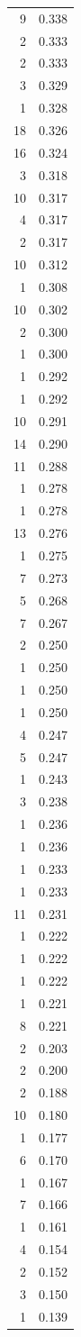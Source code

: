 \begin{tabular}{rr}
9 & 0.338 \\
2 & 0.333 \\
2 & 0.333 \\
3 & 0.329 \\
1 & 0.328 \\
18 & 0.326 \\
16 & 0.324 \\
3 & 0.318 \\
10 & 0.317 \\
4 & 0.317 \\
2 & 0.317 \\
10 & 0.312 \\
1 & 0.308 \\
10 & 0.302 \\
2 & 0.300 \\
1 & 0.300 \\
1 & 0.292 \\
1 & 0.292 \\
10 & 0.291 \\
14 & 0.290 \\
11 & 0.288 \\
1 & 0.278 \\
1 & 0.278 \\
13 & 0.276 \\
1 & 0.275 \\
7 & 0.273 \\
5 & 0.268 \\
7 & 0.267 \\
2 & 0.250 \\
1 & 0.250 \\
1 & 0.250 \\
1 & 0.250 \\
4 & 0.247 \\
5 & 0.247 \\
1 & 0.243 \\
3 & 0.238 \\
1 & 0.236 \\
1 & 0.236 \\
1 & 0.233 \\
1 & 0.233 \\
11 & 0.231 \\
1 & 0.222 \\
1 & 0.222 \\
1 & 0.222 \\
1 & 0.221 \\
8 & 0.221 \\
2 & 0.203 \\
2 & 0.200 \\
2 & 0.188 \\
10 & 0.180 \\
1 & 0.177 \\
6 & 0.170 \\
1 & 0.167 \\
7 & 0.166 \\
1 & 0.161 \\
4 & 0.154 \\
2 & 0.152 \\
3 & 0.150 \\
1 & 0.139 \\
\bottomrule
\end{tabular}
